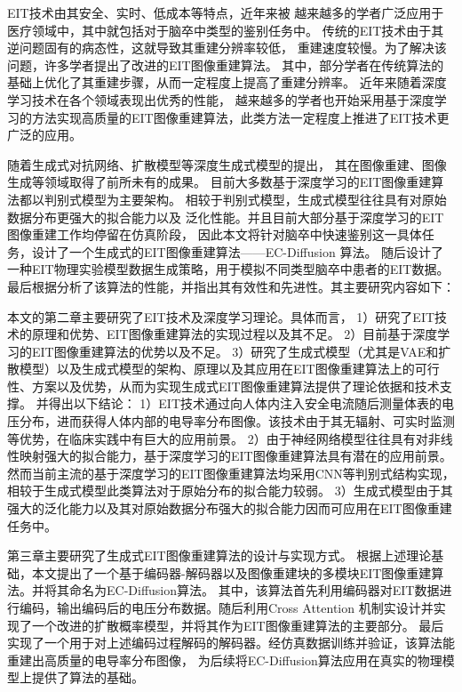 


EIT技术由其安全、实时、低成本等特点，近年来被
越来越多的学者广泛应用于医疗领域中，其中就包括对于脑卒中类型的鉴别任务中。
传统的EIT技术由于其逆问题固有的病态性，这就导致其重建分辨率较低，
重建速度较慢。为了解决该问题，许多学者提出了改进的EIT图像重建算法。
其中，部分学者在传统算法的基础上优化了其重建步骤，从而一定程度上提高了重建分辨率。
近年来随着深度学习技术在各个领域表现出优秀的性能，
越来越多的学者也开始采用基于深度学习的方法实现高质量的EIT图像重建算法，此类方法一定程度上推进了EIT技术更广泛的应用。
 
随着生成式对抗网络、扩散模型等深度生成式模型的提出，
其在图像重建、图像生成等领域取得了前所未有的成果。
目前大多数基于深度学习的EIT图像重建算法都以判别式模型为主要架构。
相较于判别式模型，生成式模型往往具有对原始数据分布更强大的拟合能力以及
泛化性能。并且目前大部分基于深度学习的EIT图像重建工作均停留在仿真阶段，
因此本文将针对脑卒中快速鉴别这一具体任务，设计了一个生成式的EIT图像重建算法——EC-Diffusion 算法。
随后设计了一种EIT物理实验模型数据生成策略，用于模拟不同类型脑卒中患者的EIT数据。最后根据分析了该算法的性能，并指出其有效性和先进性。其主要研究内容如下：
 
本文的第二章主要研究了EIT技术及深度学习理论。具体而言，
1）研究了EIT技术的原理和优势、EIT图像重建算法的实现过程以及其不足。
2）目前基于深度学习的EIT图像重建算法的优势以及不足。
3）研究了生成式模型（尤其是VAE和扩散模型）以及生成式模型的架构、原理以及其应用在EIT图像重建算法上的可行性、方案以及优势，从而为实现生成式EIT图像重建算法提供了理论依据和技术支撑。
并得出以下结论：
1）EIT技术通过向人体内注入安全电流随后测量体表的电压分布，进而获得人体内部的电导率分布图像。该技术由于其无辐射、可实时监测等优势，在临床实践中有巨大的应用前景。
2）由于神经网络模型往往具有对非线性映射强大的拟合能力，基于深度学习的EIT图像重建算法具有潜在的应用前景。然而当前主流的基于深度学习的EIT图像重建算法均采用CNN等判别式结构实现，相较于生成式模型此类算法对于原始分布的拟合能力较弱。
3）生成式模型由于其强大的泛化能力以及其对原始数据分布强大的拟合能力因而可应用在EIT图像重建任务中。

第三章主要研究了生成式EIT图像重建算法的设计与实现方式。
根据上述理论基础，本文提出了一个基于编码器-解码器以及图像重建块的多模块EIT图像重建算法。并将其命名为EC-Diffusion算法。
其中，该算法首先利用编码器对EIT数据进行编码，输出编码后的电压分布数据。随后利用Cross Attention 机制实设计并实现了一个改进的扩散概率模型，并将其作为EIT图像重建算法的主要部分。
最后实现了一个用于对上述编码过程解码的解码器。经仿真数据训练并验证，该算法能重建出高质量的电导率分布图像，
为后续将EC-Diffusion算法应用在真实的物理模型上提供了算法的基础。
 
